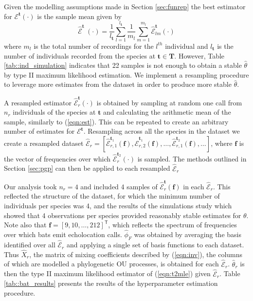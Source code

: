 \documentclass{ws-rv9x6}
\begin{document}
Given the modelling assumptions made in Section \ref{sec:funrep} the best estimator for \(\mathcal{E}^{\mathbf{t}}(\cdot)\) is the sample mean given by 
\begin{equation}
\hat{\mathcal{E}}^{\mathbf{t}}~(\cdot) = \frac{1}{l_{\mathbf{t}}} \sum_{l = 1}^{l_{\mathbf{t}}} \frac{1}{m_l} \sum_{m = 1}^{m_l} \hat{\mathcal{E}}_{lm}^{\mathbf{t}}(\cdot)
\label{eqn:est}
\end{equation}
where \(m_l\) is the total number of recordings for the \(l^{th}\) individual and \(l_{\mathbf{t}}\) is the number of individuals recorded from the species at \(\mathbf{t} \in \mathbf{T}\). However, Table \ref{tab::ind_simulation} indicates that 22 samples is not enough to obtain a stable \(\hat{\theta}\) by type II maximum likelihood estimation. We implement a resampling procedure to leverage more estimates from the dataset in order to produce more stable \(\hat{\theta}\).

A resampled estimator \(\hat{\mathcal{E}}_r^{\mathbf{t}}(\cdot)\) is obtained by sampling at random one call from \(n_r\) individuals of the species at \(\mathbf{t}\) and calculating the arithmetic mean of the sample, similarly to (\ref{eqn:est}). This can be repeated to create an arbitrary number of estimates for \(\mathcal{E}^{\mathbf{t}}\). Resampling across all the species in the dataset we create a resampled dataset \(\hat{\mathcal{E}}_r = [\hat{\mathcal{E}}_{r,1}^{\mathbf{t}_1}(\mathbf
f), \hat{\mathcal{E}}_{r,2}^{\mathbf{t}_1}(\mathbf
f), \dots, \hat{\mathcal{E}}_{r,1}^{\mathbf{t}_2}(\mathbf
f), \dots]\), where \(\mathbf{f}\) is the vector of frequencies over which \(\hat{\mathcal{E}}_{r}^{\mathbf{t}_2}(
\cdot)\) is sampled. The methods outlined in Section \ref{sec:pgp} can then be applied to each resampled \(\hat{\mathcal{E}}_r\)

Our analysis took \(n_r = 4\) and included 4 samples of \(\hat{\mathcal{E}}_r^{\mathbf{t}}(\mathbf{f})\) in each \(\hat{\mathcal{E}}_r\). This reflected the structure of the dataset, for which the minimum number of individuals per species was 4, and the results of the simulations study which showed that 4 observations per species provided reasonably stable estimates for \(\theta\). Note also that \(\mathbf{f} = [9,10, \dots, 212]^{\mathsf{T}}\), which reflects the spectrum of frequencies over which bats emit echolocation calls. \(\hat{\phi}_F\) was obtained by averaging the basis identified over all \(\hat{\mathcal{E}}_r\) and applying a single set of basis functions to each dataset. Thus \(\hat{X}_r\), the matrix of mixing coefficients described by (\ref{eqn:inv}), the columns of which are modelled a phylogenetic OU processes, is obtained for each \(\hat{\mathcal{E}}_r\). \(\hat{\theta}_r\) is then the type II maximum likelihood estimator of (\ref{eqn:t2mle}) given \(\hat{\mathcal{E}}_r\). Table \ref{tab::bat_results} presents the results of the hyperparameter estimation procedure.
\end{document}
